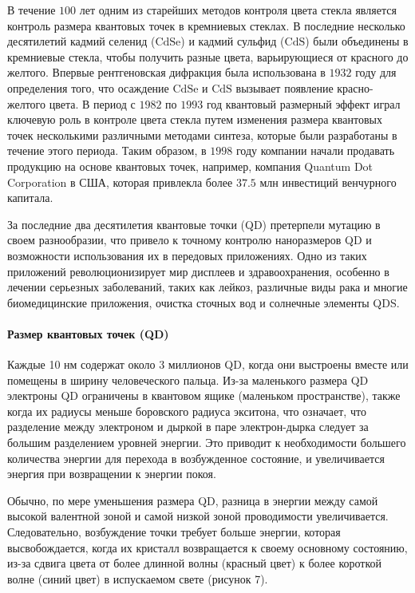 \documentclass[a4paper,14pt]{extarticle}
\begin{document}
В течение $100$ лет одним из старейших методов контроля цвета стекла является контроль размера квантовых точек в кремниевых стеклах. В последние несколько десятилетий кадмий селенид ($\text{CdSe}$) и кадмий сульфид ($\text{CdS}$) были объединены в кремниевые стекла, чтобы получить разные цвета, варьирующиеся от красного до желтого. Впервые рентгеновская дифракция была использована в $1932$ году для определения того, что осаждение $\text{CdSe}$ и $\text{CdS}$ вызывает появление красно-желтого цвета. В период с $1982$ по $1993$ год квантовый размерный эффект играл ключевую роль в контроле цвета стекла путем изменения размера квантовых точек несколькими различными методами синтеза, которые были разработаны в течение этого периода. Таким образом, в $1998$ году компании начали продавать продукцию на основе квантовых точек, например, компания Quantum Dot Corporation в США, которая привлекла более $37.5$ млн инвестиций венчурного капитала.

За последние два десятилетия квантовые точки (QD) претерпели мутацию в своем разнообразии, что привело к точному контролю наноразмеров QD и возможности использования их в передовых приложениях. Одно из таких приложений революционизирует мир дисплеев и здравоохранения, особенно в лечении серьезных заболеваний, таких как лейкоз, различные виды рака и многие биомедицинские приложения, очистка сточных вод и солнечные элементы QDS.

\paragraph{Размер квантовых точек (QD)}

Каждые 10 нм содержат около 3 миллионов QD, когда они выстроены вместе или помещены в ширину человеческого пальца. Из-за маленького размера QD электроны QD ограничены в квантовом ящике (маленьком пространстве), также когда их радиусы меньше боровского радиуса экситона, что означает, что разделение между электроном и дыркой в паре электрон-дырка следует за большим разделением уровней энергии. Это приводит к необходимости большего количества энергии для перехода в возбужденное состояние, и увеличивается энергия при возвращении к энергии покоя.

Обычно, по мере уменьшения размера QD, разница в энергии между самой высокой валентной зоной и самой низкой зоной проводимости увеличивается. Следовательно, возбуждение точки требует больше энергии, которая высвобождается, когда их кристалл возвращается к своему основному состоянию, из-за сдвига цвета от более длинной волны (красный цвет) к более короткой волне (синий цвет) в испускаемом свете (рисунок 7).\cite{mohamed}
\end{document}
